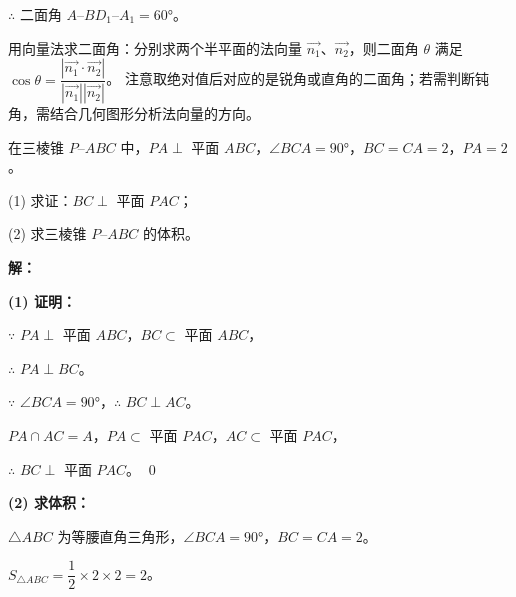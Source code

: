 \documentclass[12pt, a4paper]{ctexart}
\begin{document}
$\therefore$ 二面角 $A$--$BD_1$--$A_1 = 60°$。

\begin{tipbox}[方法总结]
用向量法求二面角：分别求两个半平面的法向量 $\vec{n_1}$、$\vec{n_2}$，则二面角 $\theta$ 满足
$\cos\theta = \dfrac{|\vec{n_1} \cdot \vec{n_2}|}{|\vec{n_1}||\vec{n_2}|}$。
注意取绝对值后对应的是锐角或直角的二面角；若需判断钝角，需结合几何图形分析法向量的方向。
\end{tipbox}

\vspace{6pt}

\begin{examplebox}
在三棱锥 $P$--$ABC$ 中，$PA \perp$ 平面 $ABC$，$\angle BCA = 90°$，$BC = CA = 2$，$PA = 2$。

(1) 求证：$BC \perp$ 平面 $PAC$；

(2) 求三棱锥 $P$--$ABC$ 的体积。

\begin{center}
\end{center}
\end{examplebox}

\textbf{解：}

\textbf{(1) 证明：}

$\because$ $PA \perp$ 平面 $ABC$，$BC \subset$ 平面 $ABC$，

$\therefore$ $PA \perp BC$。

$\because$ $\angle BCA = 90°$，$\therefore$ $BC \perp AC$。

$PA \cap AC = A$，$PA \subset$ 平面 $PAC$，$AC \subset$ 平面 $PAC$，

$\therefore$ $BC \perp$ 平面 $PAC$。 \qed

\textbf{(2) 求体积：}

$\triangle ABC$ 为等腰直角三角形，$\angle BCA = 90°$，$BC = CA = 2$。

$S_{\triangle ABC} = \dfrac{1}{2} \times 2 \times 2 = 2$。
\end{document}
